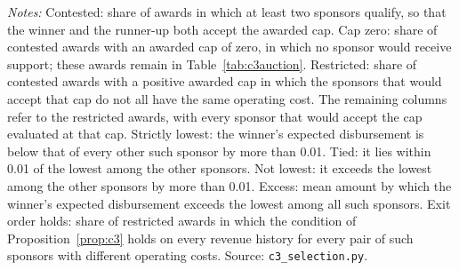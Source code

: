 \begin{table}[htbp]
\par\smallskip\begin{minipage}{\textwidth}\footnotesize\textit{Notes:} Contested: share of awards in which at least two sponsors qualify, so that the winner and the runner-up both accept the awarded cap. Cap zero: share of contested awards with an awarded cap of zero, in which no sponsor would receive support; these awards remain in Table~\ref{tab:c3auction}. Restricted: share of contested awards with a positive awarded cap in which the sponsors that would accept that cap do not all have the same operating cost. The remaining columns refer to the restricted awards, with every sponsor that would accept the cap evaluated at that cap. Strictly lowest: the winner's expected disbursement is below that of every other such sponsor by more than 0.01. Tied: it lies within 0.01 of the lowest among the other sponsors. Not lowest: it exceeds the lowest among the other sponsors by more than 0.01. Excess: mean amount by which the winner's expected disbursement exceeds the lowest among all such sponsors. Exit order holds: share of restricted awards in which the condition of Proposition~\ref{prop:c3} holds on every revenue history for every pair of such sponsors with different operating costs. Source: \texttt{c3\_selection.py}.\end{minipage}
\end{table}

